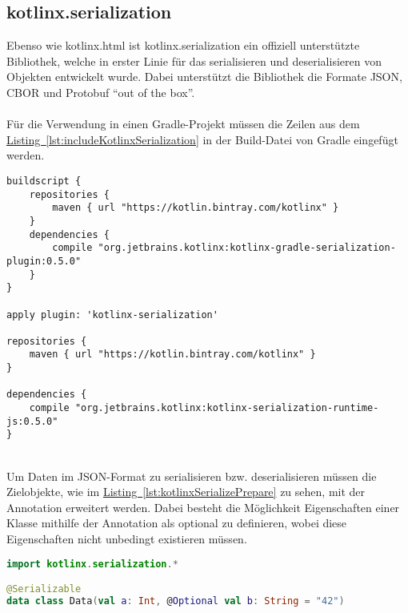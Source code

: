 \subsection{kotlinx.serialization}\label{sec:kotlinxSerialization}
Ebenso wie kotlinx.html ist kotlinx.serialization \cite{kotlinxSerialization} ein offiziell unterstützte Bibliothek, welche in erster Linie für das serialisieren und deserialisieren von Objekten entwickelt wurde. Dabei unterstützt die Bibliothek die Formate \gls{JSON}, \gls{CBOR} und \gls{Protobuf} \enquote{out of the box}.\\
\\
Für die Verwendung in einen Gradle-Projekt müssen die Zeilen aus dem \hyperref[lst:includeKotlinxSerialization]{Listing~\ref{lst:includeKotlinxSerialization}} in der Build-Datei von Gradle eingefügt werden.
\\
\begin{lstlisting}[style=lstStyleFramed, language=Gradle, caption={Einbindung der Bibliothek kotlinx.serialization mithilfe von Gradle}, label=lst:includeKotlinxSerialization, float]
buildscript {
	repositories {
		maven { url "https://kotlin.bintray.com/kotlinx" }
	}
	dependencies {
		compile "org.jetbrains.kotlinx:kotlinx-gradle-serialization-plugin:0.5.0"
	}
}

apply plugin: 'kotlinx-serialization'

repositories {
	maven { url "https://kotlin.bintray.com/kotlinx" }
}

dependencies {
	compile "org.jetbrains.kotlinx:kotlinx-serialization-runtime-js:0.5.0"
}
\end{lstlisting}
\\
Um Daten im \gls{JSON}-Format zu serialisieren bzw. deserialisieren müssen die Zielobjekte, wie im \hyperref[lst:kotlinxSerializePrepare]{Listing~\ref{lst:kotlinxSerializePrepare}} zu sehen, mit der Annotation  erweitert werden. Dabei besteht die Möglichkeit Eigenschaften einer Klasse mithilfe der Annotation  als optional zu definieren, wobei diese Eigenschaften nicht unbedingt existieren müssen.
\\
\begin{lstlisting}[style=lstStyleFramed, language=Kotlin, caption={Beispiel: Model-Erweiterung für Unterstützung der Kotlinx.serialization Bibliothek (verändert nach \cite{kotlinxSerializationExample})}, label=lst:kotlinxSerializePrepare, float]
import kotlinx.serialization.*

@Serializable
data class Data(val a: Int, @Optional val b: String = "42")
\end{lstlisting}
